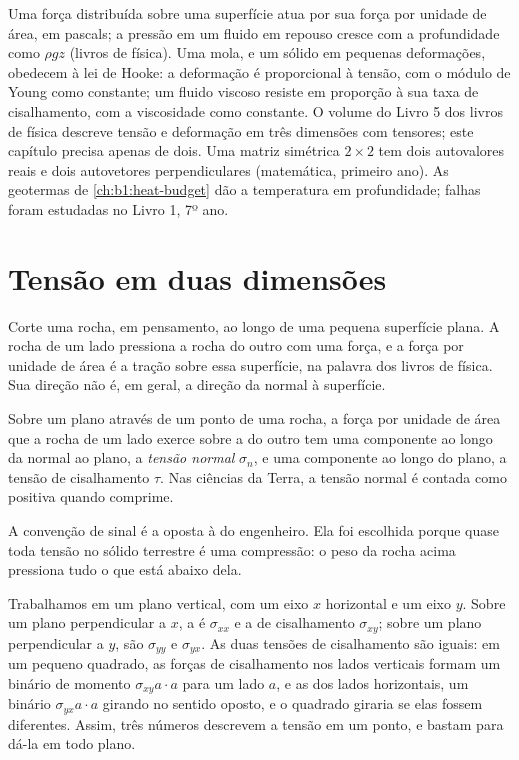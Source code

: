 \begin{recall}
Uma força distribuída sobre uma superfície atua por sua força por unidade de área, em pascals; a pressão em um fluido em repouso cresce com a profundidade como $\rho g z$ (livros de física). Uma mola, e um sólido em pequenas deformações, obedecem à lei de Hooke: a deformação é proporcional à tensão, com o módulo de Young como constante; um fluido viscoso resiste em proporção à sua taxa de cisalhamento, com a viscosidade como constante. O volume do Livro 5 dos livros de física descreve tensão e deformação em três dimensões com tensores; este capítulo precisa apenas de dois. Uma matriz simétrica $2\times2$ tem dois autovalores reais e dois autovetores perpendiculares (matemática, primeiro ano). As geotermas de \cref{ch:b1:heat-budget} dão a temperatura em profundidade; falhas foram estudadas no Livro 1, 7º ano.
\end{recall}

\section{Tensão em duas dimensões}\label{sec:b1:stress-strain-rheology:stress}

Corte uma rocha, em pensamento, ao longo de uma pequena superfície plana. A rocha de um lado pressiona a rocha do outro com uma força, e a força por unidade de área é a tração sobre essa superfície, na palavra dos livros de física. Sua direção não é, em geral, a direção da normal à superfície.

\begin{definition}\label{def:b1:stress-strain-rheology:stress}
Sobre um plano através de um ponto de uma rocha, a força por unidade de área que a rocha de um lado exerce sobre a do outro tem uma componente ao longo da normal ao plano, a \emph{tensão normal} $\sigma_n$, e uma componente ao longo do plano, a tensão de cisalhamento $\tau$. Nas ciências da Terra, a tensão normal é contada como positiva quando comprime.
\end{definition}

A convenção de sinal é a oposta à do engenheiro. Ela foi escolhida porque quase toda tensão no sólido terrestre é uma compressão: o peso da rocha acima pressiona tudo o que está abaixo dela.

Trabalhamos em um plano vertical, com um eixo $x$ horizontal e um eixo $y$. Sobre um plano perpendicular a $x$, a  é $\sigma_{xx}$ e a de cisalhamento $\sigma_{xy}$; sobre um plano perpendicular a $y$, são $\sigma_{yy}$ e $\sigma_{yx}$. As duas tensões de cisalhamento são iguais: em um pequeno quadrado, as forças de cisalhamento nos lados verticais formam um binário de momento $\sigma_{xy}a\cdot a$ para um lado $a$, e as dos lados horizontais, um binário $\sigma_{yx}a\cdot a$ girando no sentido oposto, e o quadrado giraria se elas fossem diferentes. Assim, três números descrevem a tensão em um ponto, e bastam para dá-la em todo plano.

